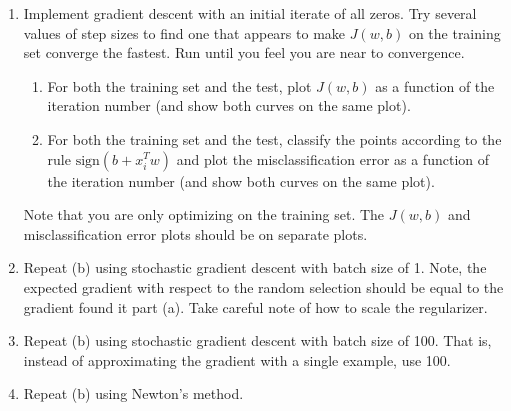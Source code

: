\documentclass{article}
\newcommand{\1}{\mathbf{1}}
\begin{document}
\begin{enumerate}
  
  \item Implement gradient descent with an initial iterate of all zeros. Try several values of step sizes to find one that appears to make $J(w,b)$ on the training set converge the fastest. Run until you feel you are near to convergence.
  \begin{enumerate}
    \item For both the training set and the test, plot $J(w,b)$ as a function of the iteration number (and show both curves on the same plot).  
    \item For both the training set and the test, classify the points according to the rule $\text{sign}(b + x_i^T w)$ and plot the misclassification error as a function of the iteration number (and show both curves on the same plot). 
  \end{enumerate}
  Note that you are only optimizing on the training set. The $J(w,b)$ and misclassification error plots should be on separate plots.
  \item Repeat (b) using stochastic gradient descent with batch size of 1. Note, the expected gradient with respect to the random selection should be equal to the gradient found it part (a). Take careful note of how to scale the regularizer.
  \item Repeat (b) using stochastic gradient descent with batch size of 100. That is, instead of approximating the gradient with a single example, use 100.
  \item Repeat (b) using Newton's method.  
\end{enumerate}
\end{document}
